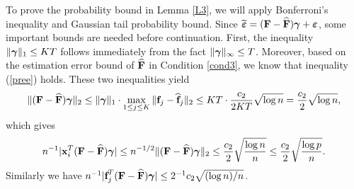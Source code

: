 \documentclass{statsoc}
\newcommand{\bff}{\mbox{\bf f}}
\newcommand{\bx}{\mbox{\bf x}}
\newcommand{\bF}{\mbox{\bf F}}
\newcommand{\bveps}{\mbox{\boldmath $\varepsilon$}}
\newcommand{\bgamma}{\mbox{\boldmath $\gamma$}}
\def\t{^T}
\begin{document}
To prove the probability bound in Lemma \ref{L3}, we will apply Bonferroni's inequality and Gaussian tail probability bound. Since $\widetilde{\bveps} = (\bF - \widehat{\bF}) \bgamma + \bveps$, some important bounds are needed before continuation. First, the inequality $\|\bgamma\|_1 \leq K T$ follows immediately from the fact $\|\bgamma\|_{\infty} \leq T$. Moreover, based on the estimation error bound of $\widehat{\bF}$ in Condition \ref{cond3}, we know that inequality (\ref{pree}) holds. These two inequalities yield
\begin{equation}\label{prederr}
\|(\bF - \widehat{\bF}) \bgamma\|_2 \leq \|\bgamma\|_1 \cdot \max_{1 \leq j \leq K}\|\bff_j - \widehat{\bff}_j\|_2 \leq K T \cdot \frac{c_2}{2K T}\sqrt{\log n} = \frac{c_2}{2} \sqrt{\log n},
\end{equation}
which gives
\begin{align}\label{XF}
n^{-1}|\bx_i\t (\bF - \widehat{\bF}) \bgamma| \leq n^{-1/2} \|(\bF - \widehat{\bF}) \bgamma\|_2 \leq \frac{c_2}{2} \sqrt{\frac{\log n}{n}}\leq \frac{c_2}{2} \sqrt{\frac{\log p}{n}}.
\end{align}
Similarly we have $n^{-1}|\bff_j\t (\bF - \widehat{\bF}) \bgamma| \leq 2^{-1}c_2 \sqrt{(\log n)/n}$.
\end{document}
